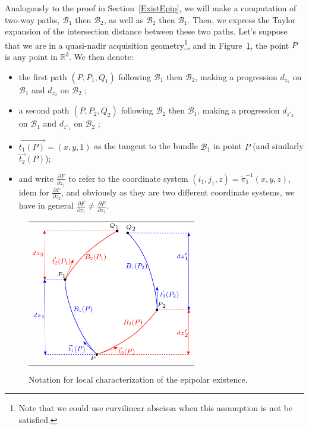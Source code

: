 \documentclass{ipol}
\newcommand{\RR}{\ensuremath{\mathbb{R}}}
\newcommand{\Bund}[1]{\ensuremath{\mathcal{B}_{#1}}}
\newcommand{\BundO}{\Bund{1}}
\newcommand{\BundT}{\Bund{2}}
\newcommand{\PiVert}{\widetilde{\pi}}
\newcommand{\DerPart}[2]{\frac{\partial #1}{\partial #2}}
\newcommand{\er}[1]{\textcolor{orange}{#1}}
\begin{document}
Analogously to the proof in Section~\ref{ExistEpip}, we will make a  computation of two-way paths, $\BundO$ then $\BundT$,
as well as $\BundT$ then  $\BundO$. Then, we express the Taylor expansion
of the intersection distance between these two paths. Let's suppose that we are in a quasi-nadir acquisition geometry\footnote{Note that we could use
          curvilinear abscissa  when this assumption is not be satisfied.}, and in Figure~\ref{EqDifEpip}, the point $P$ is any point in $\RR^3$. We then denote:
\begin{itemize}
   \item the first path $(P,P_1,Q_1)$ following  $\BundO$ then $\BundT$, making a
         progression $d_{z_1}$ on $\BundO$ and  $d_{z_2}$ on $\BundT$ ;
   \item a second path $(P,P_2,Q_2)$ following  $\BundT$ then $\BundO$, making a
         progression $d_{z'_2}$ on $\BundO$ and  $d_{z'_1}$ on $\BundT$ ;
   \item $\overrightarrow{t_1(P)}=(x,y,1)$ as the tangent to the bundle  $\BundO$  in point $P$
         (and similarly $\overrightarrow{t_2}(P)$);
   \item and write  $\DerPart{F}{z_1}$ to refer to the coordinate system $(i_1,j_1,z) = \PiVert_1^{-1}(x,y,z)$,
         idem for  $\DerPart{F}{z_2}$, and obviously as they are two different coordinate systems, we have in general
        $\DerPart{F}{z_1}  \neq \DerPart{F}{z_2}$.
\end{itemize}

\begin{figure}
\centering
\begin{tabular}{c}
\includegraphics[width=7cm]{FIGS/EquadifEpip.png}
\end{tabular}
\caption{Notation for local characterization of the epipolar existence.}
\label{EqDifEpip}
\end{figure}
\end{document}
